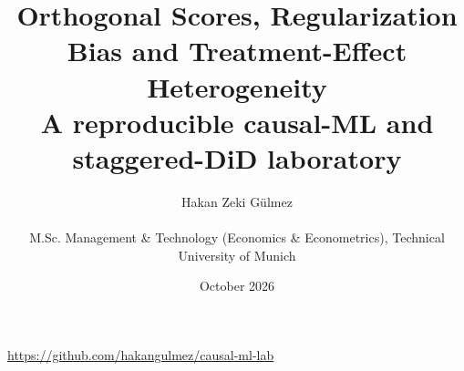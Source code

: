 
\title{Orthogonal Scores, Regularization Bias and Treatment-Effect Heterogeneity\\\large A reproducible causal-ML and staggered-DiD laboratory}
\author{Hakan Zeki Gülmez\\[0.4em]\parbox{0.94\textwidth}{\centering\small M.Sc. Management \& Technology (Economics \& Econometrics), Technical University of Munich}}
\date{October 2026}

\maketitle
\begin{center}\small\url{https://github.com/hakangulmez/causal-ml-lab}\end{center}


